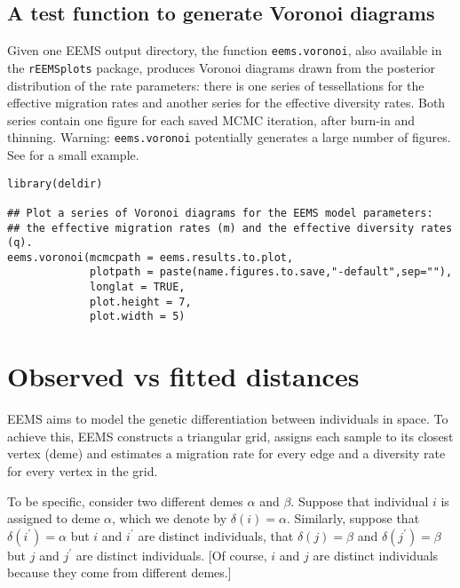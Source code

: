 \documentclass[a4paper,10pt,DIV=15,titlepage,mpinclude=true]{scrartcl}
\newcommand{\keystring}[1]{{\tt #1}}
\begin{document}
\subsection{A test function to generate Voronoi diagrams}

Given one EEMS output directory, the function \keystring{eems.voronoi}, also available in the \keystring{rEEMSplots} package, produces Voronoi diagrams drawn from the posterior distribution of the rate parameters: there is one series of tessellations for the effective migration rates and another series for the effective diversity rates. Both series contain one figure for each saved MCMC iteration, after burn-in and thinning. Warning: \keystring{eems.voronoi} potentially generates a large number of figures. See  for a small example.

\begin{lstlisting}[style=Rcode]
library(deldir)

## Plot a series of Voronoi diagrams for the EEMS model parameters:          
## the effective migration rates (m) and the effective diversity rates (q).
eems.voronoi(mcmcpath = eems.results.to.plot,
             plotpath = paste(name.figures.to.save,"-default",sep=""),
             longlat = TRUE,
             plot.height = 7,
             plot.width = 5)
\end{lstlisting}

\newpage 

\section{Observed vs fitted distances} \label{sec:obsr-vs-fitted-dist}

EEMS aims to model the genetic differentiation between individuals in space. To achieve this, EEMS constructs a triangular grid, assigns each sample to its closest vertex (deme) and estimates a migration rate for every edge and a diversity rate for every vertex in the grid. %

To be specific, consider two different demes $\alpha$ and $\beta$. Suppose that individual $i$ is assigned to deme $\alpha$, which we denote by $\delta(i) = \alpha$. Similarly, suppose that $\delta(i^\prime) = \alpha$ but $i$ and $i^\prime$ are distinct individuals, that $\delta(j) = \beta$ and $\delta(j^\prime) = \beta$ but $j$ and $j^\prime$ are distinct individuals. [Of course, $i$ and $j$ are distinct individuals because they come from different demes.]
\end{document}
